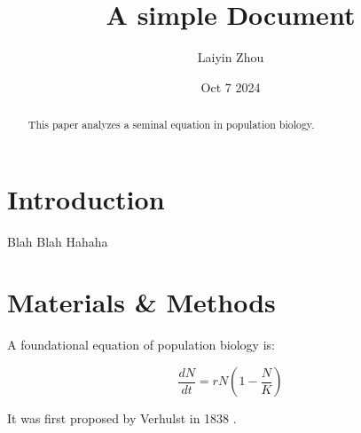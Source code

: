 \documentclass[12pt]{article}
\title{A simple Document}
\author{Laiyin Zhou}
\date{Oct 7 2024}
\begin{document}
  \maketitle

  \begin{abstract}
    This paper analyzes a seminal equation in population biology.
  \end{abstract}

  \section{Introduction}
  Blah Blah Hahaha

  \section{Materials \& Methods}

  A foundational equation of population biology is:

  \begin{equation}
    \frac{dN}{dt} = r N (1 - \frac{N}{K})
  \end{equation}

  It was first proposed by Verhulst in 1838 \cite{verhulst1838notice}.

  

  
\end{document}
